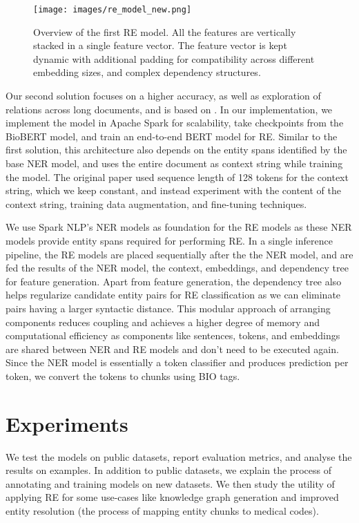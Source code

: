 \documentclass[letterpaper]{article}
\begin{document}
\begin{figure}[h!]
  \texttt{[image: images/re\_model\_new.png]}
  \caption{Overview of the first RE model. All the features are vertically stacked in a single feature vector. The feature vector is kept dynamic with additional padding for compatibility across different embedding sizes, and complex dependency structures.}
  \label{fig:re_model}
\end{figure}

Our second solution focuses on a higher accuracy, as well as exploration of relations across long documents, and is based on \cite{DBLP:journals/corr/abs-1906-03158}. In our implementation, we implement the model in Apache Spark for scalability, take checkpoints from the BioBERT model, and train an end-to-end BERT model for RE. Similar to the first solution, this architecture also depends on the entity spans identified by the base NER model, and uses the entire document as context string while training the model. The original paper used sequence length of 128 tokens for the context string, which we keep constant, and instead experiment with the content of the context string, training data augmentation, and fine-tuning techniques.

We use Spark NLP's \cite{KOCAMAN2021100058} NER models \cite{DBLP:journals/corr/abs-2012-04005} as foundation for the RE models as these NER models provide entity spans required for performing RE. In a single inference pipeline, the RE models are placed sequentially after the the NER model, and are fed the results of the NER model, the context, embeddings, and dependency tree for feature generation. Apart from feature generation, the dependency tree also helps regularize candidate entity pairs for RE classification as we can eliminate pairs having a larger syntactic distance. This modular approach of arranging components reduces coupling and achieves a higher degree of memory and computational efficiency as components like sentences, tokens, and embeddings are shared between NER and RE models and don't need to be executed again. Since the NER model is essentially a token classifier and produces prediction per token, we convert the tokens to chunks using BIO tags.

\section{Experiments}

We test the models on public datasets, report evaluation metrics, and analyse the results on examples. In addition to public datasets, we explain the process of annotating and training models on new datasets. We then study the utility of applying RE for some use-cases like knowledge graph generation and improved entity resolution (the process of mapping entity chunks to medical codes).
\end{document}

